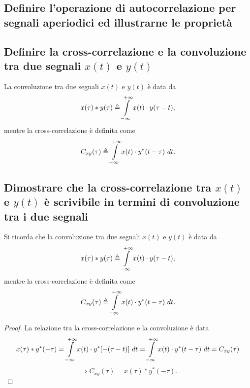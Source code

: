 \documentclass[12pt,oneside,openany]{memoir}
\numberwithin{equation}{subsection}
\newcommand{\dt}{\ dt}
\begin{document}

\newpage
\subsection{Definire l'operazione di autocorrelazione per segnali aperiodici ed
illustrarne le propriet\`a}


\newpage
\subsection{Definire la cross-correlazione e la convoluzione tra due segnali
$x(t)$ e $y(t)$}
La convoluzione tra due segnali $x(t)$ e $y(t)$ \`e data da
\[
    x(\tau) * y(\tau) \triangleq \int\displaylimits_{-\infty}^{+\infty} x(t)
    \cdot y(\tau - t),
\]
mentre la cross-correlazione \`e definita come
\[
    C_{xy} (\tau) \triangleq \int\displaylimits_{-\infty}^{+\infty} x(t) \cdot
    y^*(t - \tau) \dt.
\]


\newpage
\subsection{Dimostrare che la cross-correlazione tra $x(t)$ e $y(t)$ \`e
scrivibile in termini di convoluzione tra i due segnali}
Si ricorda che la convoluzione tra due segnali $x(t)$ e $y(t)$ \`e data da
\[
    x(\tau) * y(\tau) \triangleq \int\displaylimits_{-\infty}^{+\infty} x(t)
    \cdot y(\tau - t),
\]
mentre la cross-correlazione \`e definita come
\[
    C_{xy} (\tau) \triangleq \int\displaylimits_{-\infty}^{+\infty} x(t) \cdot
    y^*(t - \tau) \dt.
\]
\begin{proof} La relazione tra la cross-correlazione e la convoluzione \`e data
\[
    x(\tau) * y^*(-\tau) = \int\displaylimits_{-\infty}^{+\infty} x(t) \cdot
    y^*[-(\tau - t)] \dt = \int\displaylimits_{-\infty}^{+\infty} x(t) \cdot
    y^*(t - \tau) \dt = C_{xy}(\tau)
\]
\[
    \Longrightarrow C_{xy}(\tau) = x(\tau) * y^*(-\tau).
\]
\end{proof}
\end{document}
